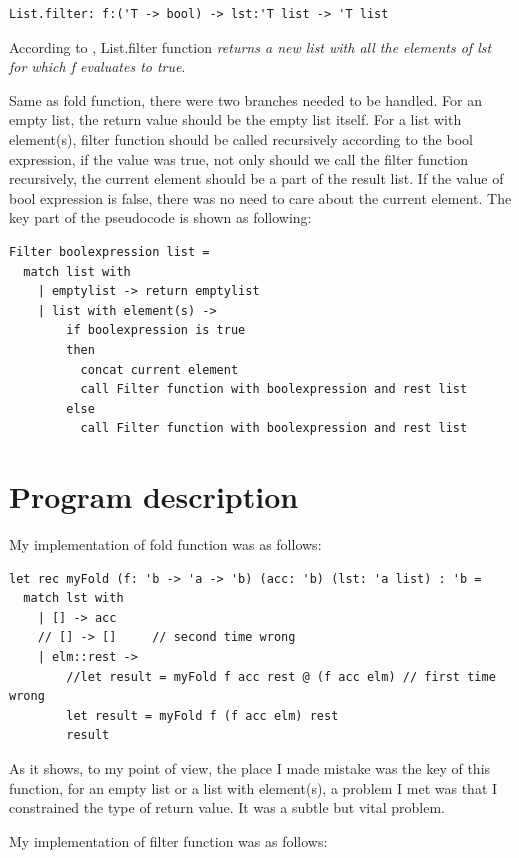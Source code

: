 \documentclass{article}
\begin{document}
\begin{lstlisting}
List.filter: f:('T -> bool) -> lst:'T list -> 'T list
\end{lstlisting}

According to \cite{sporring2019}, List.filter function \emph{returns a new list with all the elements of lst for which f evaluates to true}. 

Same as fold function, there were two branches needed to be handled. For an empty list, the return value should be the empty list itself. For a list with element(s), filter function should be called recursively according to the bool expression, if the value was true, not only should we call the filter function recursively, the current element should be a part of the result list. If the value of bool expression is false, there was no need to care about the current element. The key part of the pseudocode is shown as following:

\begin{lstlisting}
Filter boolexpression list =
  match list with
    | emptylist -> return emptylist
    | list with element(s) -> 
        if boolexpression is true
        then
          concat current element 
          call Filter function with boolexpression and rest list
        else
          call Filter function with boolexpression and rest list  

\end{lstlisting}

\section{Program description}

My implementation of fold function was as follows:

\begin{lstlisting}
let rec myFold (f: 'b -> 'a -> 'b) (acc: 'b) (lst: 'a list) : 'b =
  match lst with
    | [] -> acc
    // [] -> []		// second time wrong
    | elm::rest -> 
        //let result = myFold f acc rest @ (f acc elm) // first time wrong
        let result = myFold f (f acc elm) rest
        result
\end{lstlisting}

As it shows, to my point of view, the place I made mistake was the key of this function, for an empty list or a list with element(s), a problem I met was that I constrained the type of return value. It was a subtle but vital problem.

My implementation of filter function was as follows:
\end{document}
